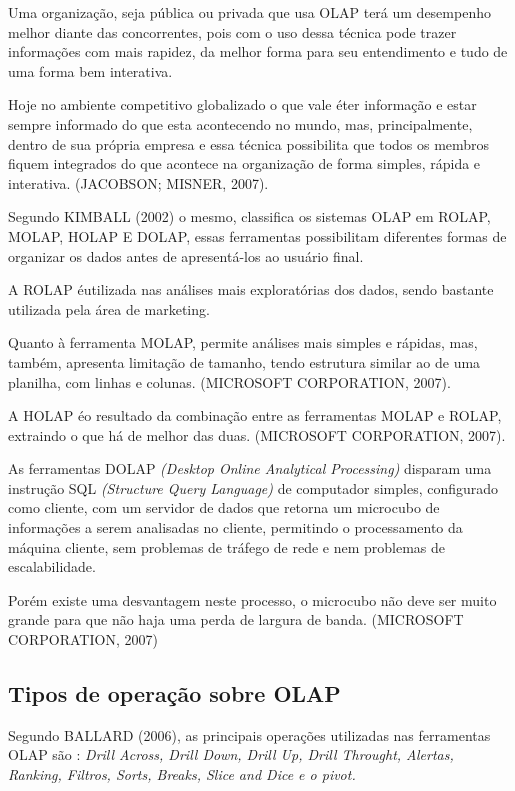 Uma organiza\c{c}\~{a}o, seja pública ou privada que usa OLAP ter\'{a} um desempenho melhor diante das concorrentes, pois com o uso dessa t\'{e}cnica pode trazer informa\c{c}\~{o}es com mais rapidez, da melhor forma para seu entendimento e tudo de uma forma bem interativa. 

Hoje no ambiente competitivo globalizado o que vale \'{e}ter informa\c{c}\~{a}o e estar sempre informado do que esta acontecendo no mundo, mas, principalmente, dentro de sua pr\'{o}pria empresa e essa t\'{e}cnica possibilita que todos os membros fiquem integrados do que acontece na organiza\c{c}\~{a}o de forma simples, r\'{a}pida e interativa. (JACOBSON; MISNER, 2007).

Segundo KIMBALL (2002) o mesmo, classifica os sistemas OLAP em ROLAP, MOLAP, HOLAP E DOLAP, essas ferramentas possibilitam diferentes formas de organizar os dados antes de apresent\'{a}-los ao usu\'{a}rio final.

A ROLAP \'{e}utilizada nas an\'{a}lises mais explorat\'{o}rias dos dados, sendo bastante utilizada pela \'{a}rea de marketing. 

Quanto \`{a} ferramenta MOLAP, permite an\'{a}lises mais simples e r\'{a}pidas, mas, tamb\'{e}m, apresenta limita\c{c}\~{a}o de tamanho, tendo estrutura similar ao de uma planilha, com linhas e colunas. (MICROSOFT CORPORATION, 2007).

A HOLAP \'{e}o resultado da combina\c{c}\~{a}o entre as ferramentas MOLAP e ROLAP, extraindo o que h\'{a} de melhor das duas. (MICROSOFT CORPORATION, 2007).

As ferramentas DOLAP \textit{(Desktop Online Analytical Processing)} disparam uma instru\c{c}\~{a}o
SQL \textit{(Structure Query Language)} de computador simples, configurado como cliente, com um servidor de dados que retorna um microcubo de informa\c{c}\~{o}es a serem analisadas no cliente, permitindo o processamento da m\'{a}quina cliente, sem problemas de tr\'{a}fego de rede e nem problemas de escalabilidade. 

Por\'{e}m existe uma desvantagem neste processo, o microcubo n\~{a}o deve ser muito grande para que n\~{a}o haja uma perda de largura de banda. (MICROSOFT CORPORATION, 2007)

\subsection{Tipos de opera\c{c}\~{a}o sobre OLAP}

Segundo BALLARD (2006), as principais opera\c{c}\~{o}es utilizadas nas ferramentas OLAP s\~{a}o : \textit{Drill Across, Drill Down, Drill Up, Drill Throught, Alertas, Ranking, Filtros, Sorts, Breaks, Slice and Dice e o pivot.}

